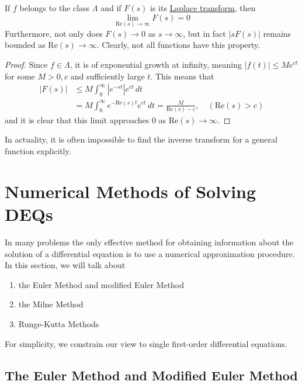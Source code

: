\documentclass{article}
\newcounter{theorem}[section]
\begin{document}
    \begin{theorem}
      \label{thm:decay-of-the-laplace-transform-at-infinity}
    If $f$ belongs to the class $\Lambda$ and if $F(s)$ is its \hyperref[def:laplace-transform]{Laplace transform}, then 
    \begin{equation}
      \lim_{\text{Re}(s) \rightarrow\infty} F(s) = 0
    \end{equation}
    Furthermore, not only does $F(s) \rightarrow 0$ as $s \rightarrow \infty$, but in fact $|s F(s)|$ remains bounded as Re$(s) \rightarrow \infty$. Clearly, not all functions have this property. 
    \end{theorem}
    \begin{proof}
    Since $f \in \Lambda$, it is of exponential growth at infinity, meaning $|f(t)| \leq Me^{ct}$ for some $M>0, c$ and sufficiently large $t$. This means that
    \begin{align*}
        |F(s)| & \leq M \int_0^\infty |e^{-st}| e^{ct} \, dt \\
        & = M \int_0^\infty e^{-\text{Re}(s) t} e^{ct}\,dt = \frac{M}{\text{Re}(s) - c}, \quad (\text{Re}(s) > c)
    \end{align*}
    and it is clear that this limit approaches $0$ as Re$(s) \rightarrow \infty$. 
    \end{proof}

    In actuality, it is often impossible to find the inverse transform for a general function explicitly. 

\section{Numerical Methods of Solving DEQs}

  In many problems the only effective method for obtaining information about the solution of a differential equation is to use a numerical approximation procedure. In this section, we will talk about
  \begin{enumerate}
      \item the Euler Method and modified Euler Method
      \item the Milne Method
      \item Runge-Kutta Methods
  \end{enumerate}
  For simplicity, we constrain our view to single first-order differential equations. 

  \subsection{The Euler Method and Modified Euler Method}
\end{document}
